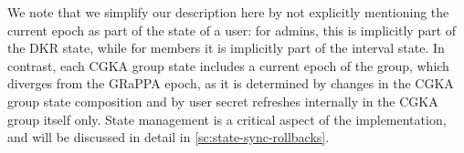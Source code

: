 We note that we simplify our description here by not explicitly mentioning the current epoch as part of the state of a user:
for admins, this is implicitly part of the DKR state, while for members it is implicitly part of the interval state.
In contrast, each CGKA group state includes a current epoch of the group,
which diverges from the GRaPPA epoch, as it is determined by changes in
the CGKA group state composition and by user secret refreshes internally in the
CGKA group itself only. State management is a critical aspect 
of the implementation, and will be discussed in detail in \cref{sc:state-sync-rollbacks}.

